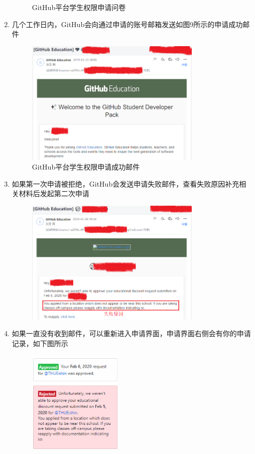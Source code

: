 \documentclass[a4paper,14pt]{article}
\begin{document}
\begin{enumerate}[1. ]
\begin{figure}[h]
\caption{GitHub平台学生权限申请问卷}
\end{figure}
\newpage
\item 几个工作日内，GitHub会向通过申请的账号邮箱发送如图9所示的申请成功邮件
\begin{figure}[h]
\centering
\includegraphics[height=6cm]{figure/GitHub_Edu_mail}
\caption{GitHub平台学生权限申请成功邮件}
\end{figure}
\item 如果第一次申请被拒绝，GitHub会发送申请失败邮件，查看失败原因补充相关材料后发起第二次申请
\begin{figure}[h]
\centering
\includegraphics[height=6cm]{figure/GitHub_Edu_mail_f}
\end{figure}
\item 如果一直没有收到邮件，可以重新进入申请界面，申请界面右侧会有你的申请记录，如下图所示
\begin{figure}[h]
\centering
\includegraphics[height=5cm]{figure/1}
\end{figure}
\end{enumerate}
\end{document}
